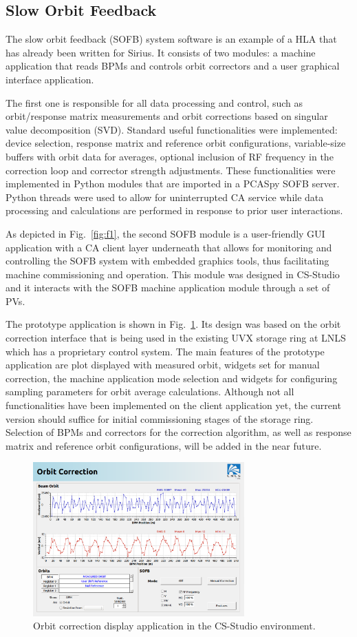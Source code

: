 \subsection{Slow Orbit Feedback}

The slow orbit feedback (SOFB) system software is an example of a HLA that has already been written for Sirius. It consists of two modules: a machine application that reads BPMs and controls orbit correctors and a user graphical interface application.

The first one is responsible for all data processing and control, such as orbit/response matrix measurements and orbit corrections based on singular value decomposition (SVD). Standard useful functionalities were implemented: device selection, response matrix and reference orbit configurations, variable-size buffers with orbit data for averages, optional inclusion of RF frequency in the correction loop and corrector strength adjustments. These functionalities were implemented in Python modules that are imported in a PCASpy SOFB server. Python threads were used to allow for uninterrupted CA service while data processing and calculations are performed in response to prior user interactions.

As depicted in Fig.~\ref{fig:f1}, the second SOFB module is a user-friendly GUI application with a CA client layer underneath that allows for monitoring and controlling the SOFB system with embedded graphics tools, thus facilitating machine commissioning and operation. This module was designed in CS-Studio and it interacts with the SOFB machine application module through a set of PVs.

The prototype application is shown in Fig.~\ref{fig:sofbf1}. Its design was based on the orbit correction interface that is being used in the existing UVX storage ring at LNLS which has a proprietary control system. The main features of the prototype application are plot displayed with measured orbit, widgets set for manual correction, the machine application mode selection and widgets for configuring sampling parameters for orbit average calculations. Although not all functionalities have been implemented on the client application yet, the current version should suffice for initial commissioning stages of the storage ring. Selection of BPMs and correctors for the correction algorithm, as well as response matrix and reference orbit configurations, will be added in the near future.

\begin{figure}[!htb]
   \centering
   \includegraphics*[width=230pt]{WEPOPRPO22f3}
   \caption{Orbit correction display application in the CS-Studio environment.}
   \label{fig:sofbf1}
\end{figure}